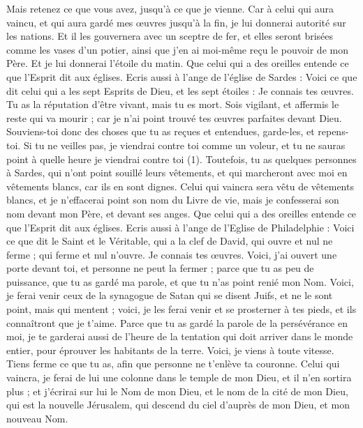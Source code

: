\begin{multicols}{2}
Mais retenez ce que vous avez, jusqu'à ce que je vienne.
Car à celui qui aura vaincu, et qui aura gardé mes œuvres jusqu'à la fin, je lui donnerai autorité sur les nations.
Et il les gouvernera avec un sceptre de fer, et elles seront brisées comme les vases d'un potier, ainsi que j’en ai moi-même reçu le pouvoir de mon Père.
Et je lui donnerai l'étoile du matin.
Que celui qui a des oreilles entende ce que l'Esprit dit aux églises.
\VerseOne{}Ecris aussi à l'ange de l'église de Sardes : Voici ce que dit celui qui a les sept Esprits de Dieu, et les sept étoiles : Je connais tes œuvres. Tu as la réputation d’être vivant, mais tu es mort.
Sois vigilant, et affermis le reste qui va mourir ; car je n'ai point trouvé tes œuvres parfaites devant Dieu.
Souviens-toi donc des choses que tu as reçues et entendues, garde-les, et repens-toi. Si tu ne veilles pas, je viendrai contre toi comme un voleur, et tu ne sauras point à quelle heure je viendrai contre toi (1).
Toutefois, tu as quelques personnes à Sardes, qui n'ont point souillé leurs vêtements, et qui marcheront avec moi en vêtements blancs, car ils en sont dignes.
Celui qui vaincra sera vêtu de vêtements blancs, et je n'effacerai point son nom du Livre de vie, mais je confesserai son nom devant mon Père, et devant ses anges.
Que celui qui a des oreilles entende ce que l'Esprit dit aux églises.
Ecris aussi à l'ange de l'Eglise de Philadelphie : Voici ce que dit le Saint et le Véritable, qui a la clef de David, qui ouvre et nul ne ferme ; qui ferme et nul n'ouvre.
Je connais tes œuvres. Voici, j’ai ouvert une porte devant toi, et personne ne peut la fermer ; parce que tu as peu de puissance, que tu as gardé ma parole, et que tu n'as point renié mon Nom.
Voici, je ferai venir ceux de la synagogue de Satan qui se disent Juifs, et ne le sont point, mais qui mentent ; voici, je les ferai venir et se prosterner à tes pieds, et ils connaîtront que je t'aime.
Parce que tu as gardé la parole de la persévérance en moi, je te garderai aussi de l'heure de la tentation qui doit arriver dans le monde entier, pour éprouver les habitants de la terre.
Voici, je viens à toute vitesse. Tiens ferme ce que tu as, afin que personne ne t'enlève ta couronne.
Celui qui vaincra, je ferai de lui une colonne dans le temple de mon Dieu, et il n'en sortira plus ; et j'écrirai sur lui le Nom de mon Dieu, et le nom de la cité de mon Dieu, qui est la nouvelle Jérusalem, qui descend du ciel d’auprès de mon Dieu, et mon nouveau Nom.

\end{multicols}
